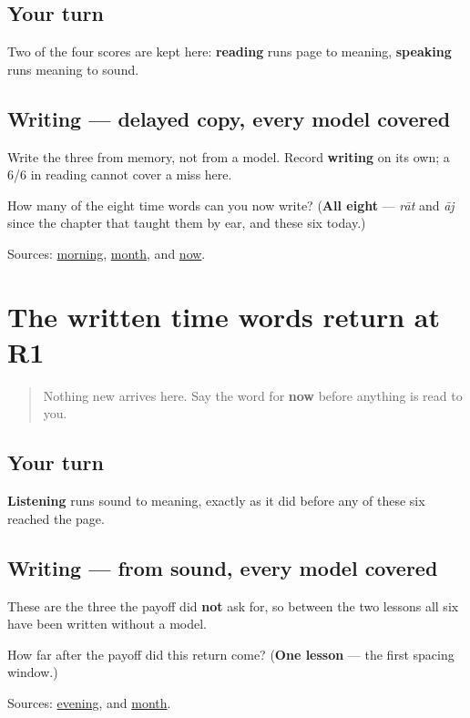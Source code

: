 \subsection*{Your turn}
Two of the four scores are kept here: \textbf{reading} runs page to meaning, \textbf{speaking} runs meaning to sound.

\subsection*{Writing — delayed copy, every model covered}
Write the three from memory, not from a model. Record \textbf{writing} on its own; a 6/6 in reading cannot cover a miss here.

\begin{tcolorbox}[breakable,colback=teal!4,colframe=teal!35!black,title={Before you move on}]
How many of the eight time words can you now write? (\textbf{All eight} — \emph{rāt} and \emph{āj} since the chapter that taught them by ear, and these six today.)

Sources: \href{https://dictionary.cambridge.org/dictionary/english-gujarati/morning}{morning}, \href{https://dictionary.cambridge.org/dictionary/english-gujarati/month}{month}, and \href{https://dictionary.cambridge.org/dictionary/english-gujarati/now}{now}.
\end{tcolorbox}
\section[Practice]{The written time words return at R1}

\label{lesson:GU-R25-time-written-r1}



\begin{quote}
Nothing new arrives here. Say the word for \textbf{now} before anything is read to you.
\end{quote}

\subsection*{Your turn}
\textbf{Listening} runs sound to meaning, exactly as it did before any of these six reached the page.

\subsection*{Writing — from sound, every model covered}
These are the three the payoff did \textbf{not} ask for, so between the two lessons all six have been written without a model.

\begin{tcolorbox}[breakable,colback=teal!4,colframe=teal!35!black,title={Before you move on}]
How far after the payoff did this return come? (\textbf{One lesson} — the first spacing window.)

Sources: \href{https://dictionary.cambridge.org/dictionary/english-gujarati/evening}{evening}, and \href{https://dictionary.cambridge.org/dictionary/english-gujarati/month}{month}.
\end{tcolorbox}
